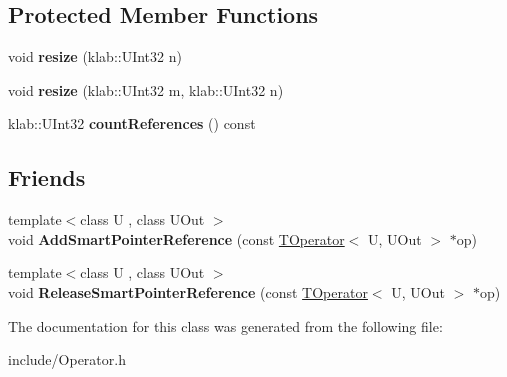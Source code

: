 \subsection*{Protected Member Functions}
\begin{DoxyCompactItemize}
\item 
void {\bfseries resize} (klab\+::\+U\+Int32 n)\hypertarget{classkl1p_1_1TOperator_a0342d203fa96d76c281667cdbf3a8b32}{}\label{classkl1p_1_1TOperator_a0342d203fa96d76c281667cdbf3a8b32}

\item 
void {\bfseries resize} (klab\+::\+U\+Int32 m, klab\+::\+U\+Int32 n)\hypertarget{classkl1p_1_1TOperator_aa90c7eb0de08747321aecb0eb8ef2991}{}\label{classkl1p_1_1TOperator_aa90c7eb0de08747321aecb0eb8ef2991}

\item 
klab\+::\+U\+Int32 {\bfseries count\+References} () const \hypertarget{classkl1p_1_1TOperator_a4b6d8c577ea3d89ccebf42615ea3b4f4}{}\label{classkl1p_1_1TOperator_a4b6d8c577ea3d89ccebf42615ea3b4f4}

\end{DoxyCompactItemize}
\subsection*{Friends}
\begin{DoxyCompactItemize}
\item 
{\footnotesize template$<$class U , class U\+Out $>$ }\\void {\bfseries Add\+Smart\+Pointer\+Reference} (const \hyperlink{classkl1p_1_1TOperator}{T\+Operator}$<$ U, U\+Out $>$ $\ast$op)\hypertarget{classkl1p_1_1TOperator_a4204374aad38b74f269303c3c038905d}{}\label{classkl1p_1_1TOperator_a4204374aad38b74f269303c3c038905d}

\item 
{\footnotesize template$<$class U , class U\+Out $>$ }\\void {\bfseries Release\+Smart\+Pointer\+Reference} (const \hyperlink{classkl1p_1_1TOperator}{T\+Operator}$<$ U, U\+Out $>$ $\ast$op)\hypertarget{classkl1p_1_1TOperator_a506941e768851fc99992dd5c3f4dc807}{}\label{classkl1p_1_1TOperator_a506941e768851fc99992dd5c3f4dc807}

\end{DoxyCompactItemize}


The documentation for this class was generated from the following file\+:\begin{DoxyCompactItemize}
\item 
include/Operator.\+h\end{DoxyCompactItemize}
